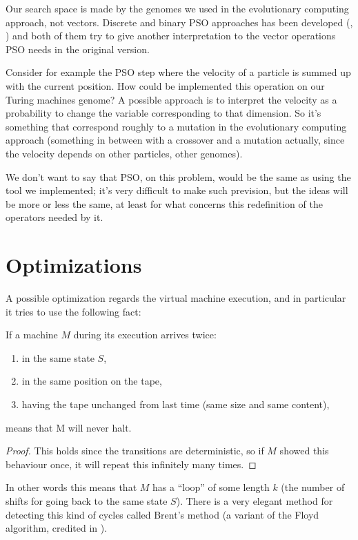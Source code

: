 \documentclass{report}
\begin{document}
Our search space is made by the genomes we used in the evolutionary computing approach, not vectors. Discrete and binary PSO approaches has been developed (\cite{dpso}, \cite{binary-pso}) and both of them try to give another interpretation to the vector operations PSO needs in the original version.

Consider for example the PSO step where the velocity of a particle is summed up with the current position. How could be implemented this operation on our Turing machines genome? A possible approach is to interpret the velocity as a probability to change the variable corresponding to that dimension.
So it's something that correspond roughly to a mutation in the evolutionary computing approach (something in between with a crossover and a mutation actually, since the velocity depends on other particles, other genomes).

We don't want to say that PSO, on this problem, would be the same as using the tool we implemented; it's very difficult to make such prevision, but the ideas will be more or less the same, at least for what concerns this redefinition of the operators needed by it.

\section{Optimizations}
A possible optimization regards the virtual machine execution, and in particular it tries to use the following fact:

\begin{Thm}
If a machine $M$ during its execution arrives twice:
\begin{enumerate}
\item in the same state $S$,
\item in the same position on the tape,
\item having the tape unchanged from last time (same size and same content),
\end{enumerate}
means that M will never halt.
\end{Thm}
\begin{proof}
This holds since the transitions are deterministic, so if $M$ showed this behaviour once, it will repeat this infinitely many times.
\end{proof}

In other words this means that $M$ has a ``loop'' of some length $k$ (the number of shifts for going back to the same state $S$). There is a very elegant method for detecting this kind of cycles called Brent's method \cite{brent} (a variant of the Floyd algorithm, credited in \cite{knuth}).
\end{document}
